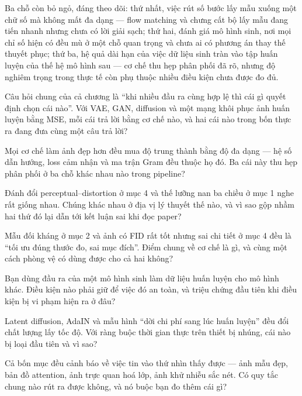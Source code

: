 \documentclass[../../deep_learning.tex]{subfiles}
\begin{document}
Ba chỗ còn bỏ ngỏ, đáng theo dõi: thứ nhất, việc rút số bước lấy mẫu xuống một chữ số mà không mất đa dạng --- flow matching và chưng cất bộ lấy mẫu đang tiến nhanh nhưng chưa có lời giải sạch; thứ hai, đánh giá mô hình sinh, nơi mọi chỉ số hiện có đều mù ở một chỗ quan trọng và chưa ai có phương án thay thế thuyết phục; thứ ba, hệ quả dài hạn của việc dữ liệu sinh tràn vào tập huấn luyện của thế hệ mô hình sau --- cơ chế thu hẹp phân phối đã rõ, nhưng độ nghiêm trọng trong thực tế còn phụ thuộc nhiều điều kiện chưa được đo đủ.
\begin{tukiem}
\item Câu hỏi chung của cả chương là ``khi nhiều đầu ra cùng hợp lệ thì cái gì quyết định chọn cái nào''. Với VAE, GAN, diffusion và một mạng khôi phục ảnh huấn luyện bằng MSE, mỗi cái trả lời bằng cơ chế nào, và hai cái nào trong bốn thực ra đang đưa cùng một câu trả lời?
\item Mọi cơ chế làm ảnh đẹp hơn đều mua độ trung thành bằng độ đa dạng --- hệ số dẫn hướng, loss cảm nhận và ma trận Gram đều thuộc họ đó. Ba cái này thu hẹp phân phối ở ba chỗ khác nhau nào trong pipeline?
\item Đánh đổi perceptual--distortion ở mục 4 và thế lưỡng nan ba chiều ở mục 1 nghe rất giống nhau. Chúng khác nhau ở địa vị lý thuyết thế nào, và vì sao gộp nhầm hai thứ đó lại dẫn tới kết luận sai khi đọc paper?
\item Mẫu đối kháng ở mục 2 và ảnh có FID rất tốt nhưng sai chi tiết ở mục 4 đều là ``tối ưu đúng thước đo, sai mục đích''. Điểm chung về cơ chế là gì, và cùng một cách phòng vệ có dùng được cho cả hai không?
\item Bạn dùng đầu ra của một mô hình sinh làm dữ liệu huấn luyện cho mô hình khác. Điều kiện nào phải giữ để việc đó an toàn, và triệu chứng đầu tiên khi điều kiện bị vi phạm hiện ra ở đâu?
\item Latent diffusion, AdaIN và mẫu hình ``dời chi phí sang lúc huấn luyện'' đều đổi chất lượng lấy tốc độ. Với ràng buộc thời gian thực trên thiết bị nhúng, cái nào bị loại đầu tiên và vì sao?
\item Cả bốn mục đều cảnh báo về việc tin vào thứ nhìn thấy được --- ảnh mẫu đẹp, bản đồ attention, ảnh trực quan hoá lớp, ảnh khử nhiễu sắc nét. Có quy tắc chung nào rút ra được không, và nó buộc bạn đo thêm cái gì?
\end{tukiem}
\ifSubfilesClassLoaded{\printbibliography[title={Nguồn}]}{}
\end{document}
